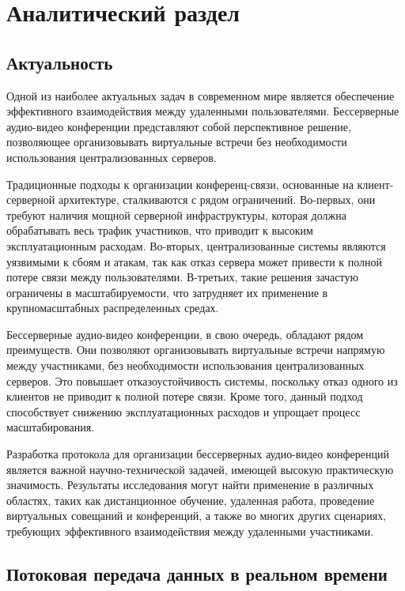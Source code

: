 \chapter{Аналитический раздел}

\section{Актуальность}

Одной из наиболее актуальных задач в современном мире является обеспечение эффективного взаимодействия между удаленными пользователями. Бессерверные аудио-видео конференции представляют собой перспективное решение, позволяющее организовывать виртуальные встречи без необходимости использования централизованных серверов.

Традиционные подходы к организации конференц-связи, основанные на клиент-серверной архитектуре, сталкиваются с рядом ограничений. Во-первых, они требуют наличия мощной серверной инфраструктуры, которая должна обрабатывать весь трафик участников, что приводит к высоким эксплуатационным расходам. Во-вторых, централизованные системы являются уязвимыми к сбоям и атакам, так как отказ сервера может привести к полной потере связи между пользователями. В-третьих, такие решения зачастую ограничены в масштабируемости, что затрудняет их применение в крупномасштабных распределенных средах.

Бессерверные аудио-видео конференции, в свою очередь, обладают рядом преимуществ. Они позволяют организовывать виртуальные встречи напрямую между участниками, без необходимости использования централизованных серверов. Это повышает отказоустойчивость системы, поскольку отказ одного из клиентов не приводит к полной потере связи. Кроме того, данный подход способствует снижению эксплуатационных расходов и упрощает процесс масштабирования.

Разработка протокола для организации бессерверных аудио-видео конференций является важной научно-технической задачей, имеющей высокую практическую значимость. Результаты исследования могут найти применение в различных областях, таких как дистанционное обучение, удаленная работа, проведение виртуальных совещаний и конференций, а также во многих других сценариях, требующих эффективного взаимодействия между удаленными участниками.

\section{Потоковая передача данных в реальном времени}

